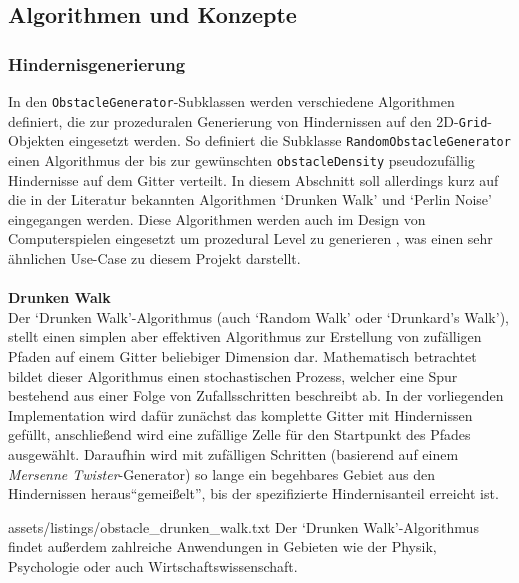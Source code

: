 \subsection{Algorithmen und Konzepte}
\label{subsec:aufbau_backend_konzepte}
\subsubsection{Hindernisgenerierung}
In den \texttt{ObstacleGenerator}-Subklassen werden verschiedene Algorithmen definiert, die zur prozeduralen Generierung von
Hindernissen auf den 2D-\texttt{Grid}-Objekten eingesetzt werden.
So definiert die Subklasse \texttt{RandomObstacleGenerator} einen Algorithmus der bis zur gewünschten \texttt{obstacleDensity}
pseudozufällig Hindernisse auf dem Gitter verteilt.
In diesem Abschnitt soll allerdings kurz auf die in der Literatur bekannten Algorithmen `Drunken Walk' und `Perlin Noise' eingegangen werden.
Diese Algorithmen werden auch im Design von Computerspielen eingesetzt um prozedural Level zu generieren \cite{koesnaedi2022, andrian2023},
was einen sehr ähnlichen Use-Case zu diesem Projekt darstellt.\\\\

\textbf{Drunken Walk}\\
Der `Drunken Walk'-Algorithmus (auch `Random Walk' oder `Drunkard's Walk'), stellt einen simplen aber effektiven Algorithmus
zur Erstellung von zufälligen Pfaden auf einem Gitter beliebiger Dimension dar.
Mathematisch betrachtet bildet dieser Algorithmus einen stochastischen Prozess, welcher eine Spur bestehend aus
einer Folge von Zufallsschritten beschreibt ab. \cite{pearson1905}
In der vorliegenden Implementation wird dafür zunächst das komplette Gitter mit Hindernissen gefüllt, anschließend wird
eine zufällige Zelle für den Startpunkt des Pfades ausgewählt.
Daraufhin wird mit zufälligen Schritten (basierend auf einem \textit{Mersenne Twister}-Generator) so lange ein begehbares Gebiet aus den Hindernissen heraus``gemeißelt'', bis der
spezifizierte Hindernisanteil erreicht ist.

    {assets/listings/obstacle_drunken_walk.txt}
Der `Drunken Walk'-Algorithmus findet außerdem zahlreiche Anwendungen in Gebieten wie der Physik, Psychologie oder auch Wirtschaftswissenschaft. \cite{weiss1982, nosofsky1997, kodde1984}\\\\

